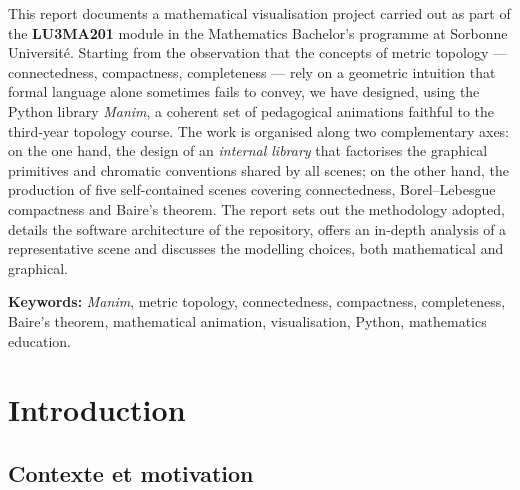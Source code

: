 \documentclass[12pt, a4paper, openany]{report}
\begin{document}
	\begin{tcolorbox}[
		enhanced,
		colback=SorbonneCiel!3, colframe=SorbonneCiel!20,
		arc=3pt, boxrule=0.4pt,
		left=12pt, right=12pt, top=10pt, bottom=10pt,
		title={\textbf{Abstract}}, coltitle=SorbonneCiel!80!SorbonneBleu, fonttitle=\large,
		attach boxed title to top left={yshift=-\tcboxedtitleheight/2, xshift=1em},
		boxed title style={colback=white, colframe=white, boxrule=0pt},
	]
		This report documents a mathematical visualisation project carried out as part of the \textbf{LU3MA201} module in the Mathematics Bachelor's programme at Sorbonne Université. Starting from the observation that the concepts of metric topology --- connectedness, compactness, completeness --- rely on a geometric intuition that formal language alone sometimes fails to convey, we have designed, using the Python library \textit{Manim}, a coherent set of pedagogical animations faithful to the third-year topology course. The work is organised along two complementary axes: on the one hand, the design of an \emph{internal library} that factorises the graphical primitives and chromatic conventions shared by all scenes; on the other hand, the production of five self-contained scenes covering connectedness, Borel--Lebesgue compactness and Baire's theorem. The report sets out the methodology adopted, details the software architecture of the repository, offers an in-depth analysis of a representative scene and discusses the modelling choices, both mathematical and graphical.

		\medskip
		\textbf{Keywords:} \textit{Manim}, metric topology, connectedness, compactness, completeness, Baire's theorem, mathematical animation, visualisation, Python, mathematics education.
	\end{tcolorbox}
	
	\newpage
	{
		\hypersetup{linkcolor=SorbonneBleu}
		\tableofcontents
	}
	\newpage
	
	\chapter{Introduction}\label{chap:introduction}

	\section{Contexte et motivation}
\end{document}
